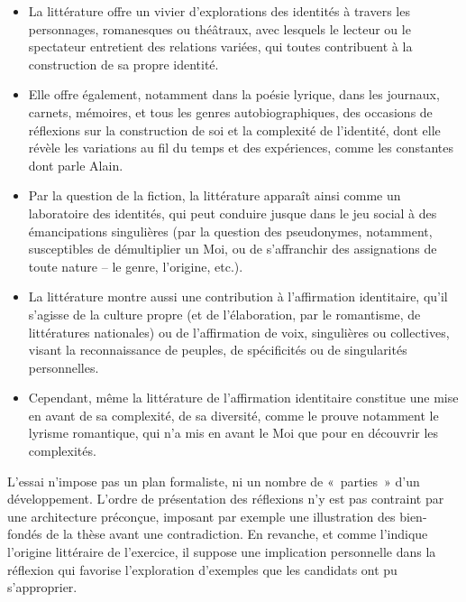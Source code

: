 {\begin{itemize}
\item La littérature offre un vivier d'explorations des identités à travers les personnages,
romanesques ou théâtraux, avec lesquels le lecteur ou le spectateur entretient des
relations variées, qui toutes contribuent à la construction de sa propre identité.
\item Elle offre également, notamment dans la poésie lyrique, dans les journaux, carnets,
mémoires, et tous les genres autobiographiques, des occasions de réflexions sur la
construction de soi et la complexité de l'identité, dont elle révèle les variations au
fil du temps et des expériences, comme les constantes dont parle Alain.
\item Par la question de la fiction, la littérature apparaît ainsi comme un laboratoire
des identités, qui peut conduire jusque dans le jeu social à des émancipations
singulières (par la question des pseudonymes, notamment, susceptibles de
démultiplier un Moi, ou de s'affranchir des assignations de toute nature – le genre,
l'origine, etc.).
\item La littérature montre aussi une contribution à l'affirmation identitaire, qu'il
s'agisse de la culture propre (et de l'élaboration, par le romantisme, de littératures
nationales) ou de l'affirmation de voix, singulières ou collectives, visant la
reconnaissance de peuples, de spécificités ou de singularités personnelles.
\item Cependant, même la littérature de l'affirmation identitaire constitue une mise en
avant de sa complexité, de sa diversité, comme le prouve notamment le lyrisme
romantique, qui n'a mis en avant le Moi que pour en découvrir les complexités.
\end{itemize}

L'essai n'impose pas un plan formaliste, ni un nombre de «~parties~» d'un
développement. L'ordre de présentation des réflexions n'y est pas contraint par une
architecture préconçue, imposant par exemple une illustration des bien-fondés de
la thèse avant une contradiction. En revanche, et comme l'indique l'origine littéraire
de l'exercice, il suppose une implication personnelle dans la réflexion qui favorise
l'exploration d'exemples que les candidats ont pu s'approprier.}%

